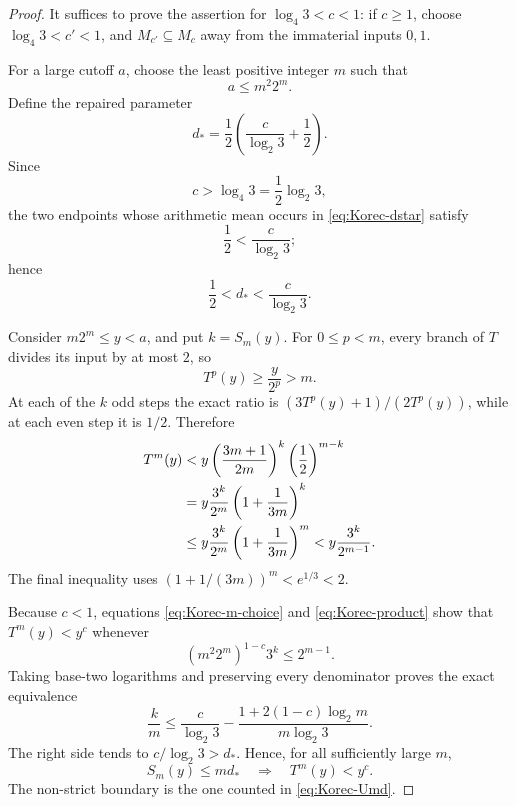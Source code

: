 \begin{proof}
It suffices to prove the assertion for
\(\log_4 3<c<1\): if \(c\ge1\), choose
\(\log_4 3<c'<1\), and \(M_{c'}\subseteq M_c\) away from the immaterial
inputs \(0,1\).

For a large cutoff \(a\), choose the least positive integer \(m\) such that
\begin{equation}
\label{eq:Korec-m-choice}
 a\le m^2 2^m.
\end{equation}
Define the repaired parameter
\begin{equation}
\label{eq:Korec-dstar}
 d_*=\frac12\left(\frac{c}{\log_2 3}+\frac12\right).
\end{equation}
Since
\[
 c>\log_4 3=\frac12\log_2 3,
\]
the two endpoints whose arithmetic mean occurs in
\eqref{eq:Korec-dstar} satisfy
\[
 \frac12<\frac{c}{\log_2 3};
\]
hence
\begin{equation}
\label{eq:Korec-dstar-interval}
 \frac12<d_*<\frac{c}{\log_2 3}.
\end{equation}

Consider \(m2^m\le y<a\), and put \(k=S_m(y)\).  For \(0\le p<m\),
every branch of \(T\) divides its input by at most \(2\), so
\[
 T^p(y)\ge\frac{y}{2^p}>m.
\]
At each of the \(k\) odd steps the exact ratio is
\((3T^p(y)+1)/(2T^p(y))\), while at each even step it is \(1/2\).
Therefore
\begin{align}
 T^m(y)
 &<y\left(\frac{3m+1}{2m}\right)^k
       \left(\frac12\right)^{m-k} \notag\\
 &=y\frac{3^k}{2^m}
       \left(1+\frac1{3m}\right)^k \notag\\
 &\le y\frac{3^k}{2^m}
       \left(1+\frac1{3m}\right)^m
 <y\frac{3^k}{2^{m-1}}.                                \label{eq:Korec-product}
\end{align}
The final inequality uses
\((1+1/(3m))^m<e^{1/3}<2\).

Because \(c<1\), equations
\eqref{eq:Korec-m-choice} and \eqref{eq:Korec-product} show that
\(T^m(y)<y^c\) whenever
\begin{equation}
\label{eq:Korec-sufficient-product}
 (m^2 2^m)^{1-c}3^k\le2^{m-1}.
\end{equation}
Taking base-two logarithms and preserving every denominator proves the exact
equivalence
\begin{equation}
\label{eq:Korec-exact-k-condition}
 \frac{k}{m}
 \le
 \frac{c}{\log_2 3}
 -\frac{1+2(1-c)\log_2m}{m\log_2 3}.
\end{equation}
The right side tends to \(c/\log_2 3>d_*\).  Hence, for all sufficiently
large \(m\),
\[
 S_m(y)\le md_*
 \quad\Longrightarrow\quad
 T^m(y)<y^c.
\]
The non-strict boundary is the one counted in \eqref{eq:Korec-Umd}.


\end{proof}
